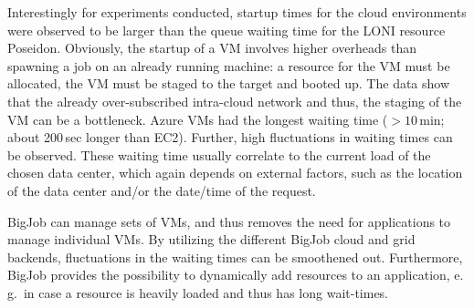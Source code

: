 \documentclass[conference,final]{IEEEtran}
\newcommand{\alnote}[1]{ {\textcolor{blue} { ***AL: #1 }}}
\newcommand{\jhanote}[1]{ {\textcolor{red} { ***SJ: #1 }}}
\newcommand{\alnote}[1]{}
\newcommand{\jhanote}[1]{}
\begin{document}
Interestingly for experiments conducted,  startup times for the
cloud environments were observed to be larger than the queue waiting
time for the LONI resource Poseidon. %
Obviously, the startup of a VM involves higher overheads than spawning
a job on an already running machine: a resource for the VM must be
allocated, the VM must be staged to the target and booted up. The data
show that
the already over-subscribed intra-cloud network and thus, the staging
of the VM can be a bottleneck. Azure VMs had the longest waiting time
($>10$\,min; about 200\,sec longer than EC2).
Further, high fluctuations in waiting times can be observed. These
waiting time usually correlate to the current load of the chosen data
center, which again depends on external factors, such as the location
of the data center and/or the date/time of the request.

BigJob can manage sets of VMs, and thus removes the need for 
applications to manage individual VMs. By utilizing the different
BigJob cloud and grid backends, fluctuations in the waiting times can
be smoothened out. Furthermore, BigJob provides the possibility to
dynamically add resources to an application, e.\,g.\ in case a
resource is heavily loaded and thus has long wait-times.
\end{document}
